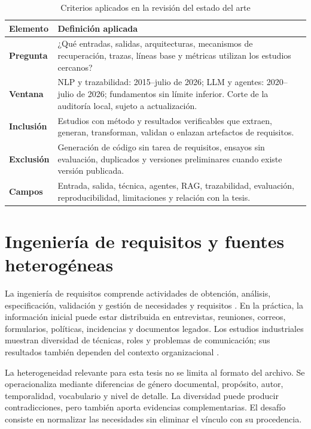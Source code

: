 \begin{table}[H]
  \centering
  \caption{Criterios aplicados en la revisión del estado del arte}
  \label{tab:criterios-revision}
  \small
  \begin{tabularx}{\textwidth}{>{\bfseries}p{}Y}
    \toprule
    Elemento & Definición aplicada \\
    \midrule
    Pregunta & ¿Qué entradas, salidas, arquitecturas, mecanismos de recuperación, trazas, líneas base y métricas utilizan los estudios cercanos? \\
    Ventana & NLP y trazabilidad: 2015--julio de 2026; LLM y agentes: 2020--julio de 2026; fundamentos sin límite inferior. Corte de la auditoría local, sujeto a actualización. \\
    Inclusión & Estudios con método y resultados verificables que extraen, generan, transforman, validan o enlazan artefactos de requisitos. \\
    Exclusión & Generación de código sin tarea de requisitos, ensayos sin evaluación, duplicados y versiones preliminares cuando existe versión publicada. \\
    Campos & Entrada, salida, técnica, agentes, RAG, trazabilidad, evaluación, reproducibilidad, limitaciones y relación con la tesis. \\
    \bottomrule
  \end{tabularx}
\end{table}

\section{Ingeniería de requisitos y fuentes heterogéneas}

La ingeniería de requisitos comprende actividades de obtención, análisis, especificación, validación y gestión de necesidades y requisitos \cite{iso29148,sommerville2011}. En la práctica, la información inicial puede estar distribuida en entrevistas, reuniones, correos, formularios, políticas, incidencias y documentos legados. Los estudios industriales muestran diversidad de técnicas, roles y problemas de comunicación; sus resultados también dependen del contexto organizacional \cite{wagner2019,palomares2021}.

La heterogeneidad relevante para esta tesis no se limita al formato del archivo. Se operacionaliza mediante diferencias de género documental, propósito, autor, temporalidad, vocabulario y nivel de detalle. La diversidad puede producir contradicciones, pero también aporta evidencias complementarias. El desafío consiste en normalizar las necesidades sin eliminar el vínculo con su procedencia.

